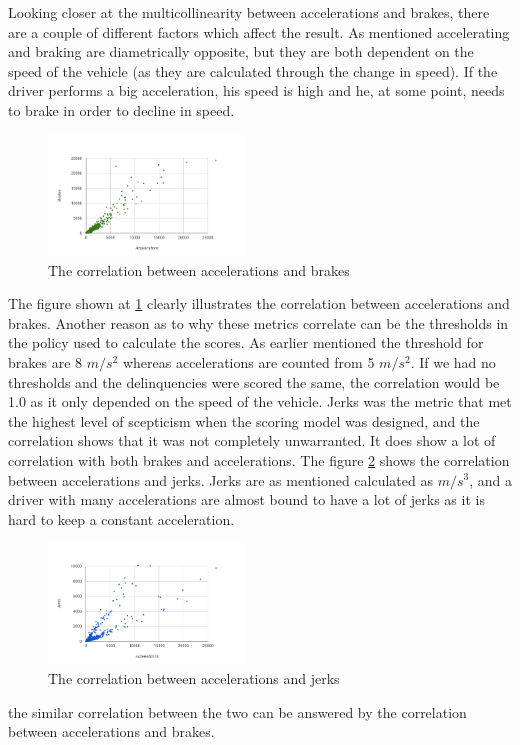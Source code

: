 Looking closer at the multicollinearity between accelerations and brakes, there are a couple of different factors which affect the result. As mentioned accelerating and braking are diametrically opposite, but they are both dependent on the speed of the vehicle (as they are calculated through the change in speed). If the driver performs a big acceleration, his speed is high and he, at some point, needs to brake in order to decline in speed. 

\begin{figure}[tb]
\centering
\includegraphics[width=0.465\textwidth]{Pictures/abcorrel}
\caption{The correlation between accelerations and brakes}
\label{fig:abcorrel}
\end{figure}

The figure shown at \ref{fig:abcorrel} clearly illustrates the correlation between accelerations and brakes. Another reason as to why these metrics correlate can be the thresholds in the policy used to calculate the scores. As earlier mentioned the threshold for brakes are 8 $m/s^2$ whereas accelerations are counted from 5 $m/s^2$. If we had no thresholds and the delinquencies were scored the same, the correlation would be 1.0 as it only depended on the speed of the vehicle. 
Jerks was the metric that met the highest level of scepticism when the scoring model was designed, and the correlation shows that it was not completely unwarranted. It does show a lot of correlation with both brakes and accelerations. The figure \ref{fig:ajcorrel} shows the correlation between accelerations and jerks. Jerks are as mentioned calculated as $m/s^3$, and a driver with many accelerations are almost bound to have a lot of jerks as it is hard to keep a constant acceleration.

\begin{figure}[tb]
\centering
\includegraphics[width=0.465\textwidth]{Pictures/ajcorrel}
\caption{The correlation between accelerations and jerks}
\label{fig:ajcorrel}
\end{figure}


the similar correlation between the two can be answered by the correlation between accelerations and brakes. 

